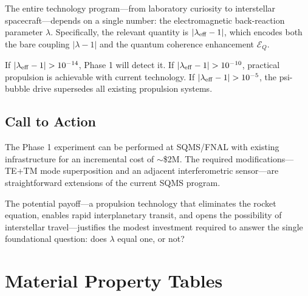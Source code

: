 \documentclass[twocolumn,prl,superscriptaddress,nofootinbib,longbibliography,floatfix]{revtex4-2}
\begin{document}
The entire technology program---from laboratory curiosity to
interstellar spacecraft---depends on a single number: the
electromagnetic back-reaction parameter $\lambda$.  Specifically, the
relevant quantity is $|\lambda_{\rm eff} - 1|$, which encodes both the
bare coupling $|\lambda - 1|$ and the quantum coherence enhancement
$\mathcal{E}_Q$.

If $|\lambda_{\rm eff} - 1| > 10^{-14}$, Phase 1 will detect it.
If $|\lambda_{\rm eff} - 1| > 10^{-10}$, practical propulsion is
achievable with current technology.
If $|\lambda_{\rm eff} - 1| > 10^{-5}$, the psi-bubble drive
supersedes all existing propulsion systems.

\subsection{Call to Action}

The Phase 1 experiment can be performed at SQMS/FNAL with existing
infrastructure for an incremental cost of $\sim$\$2M.  The required
modifications---TE+TM mode superposition and an adjacent
interferometric sensor---are straightforward extensions of the current
SQMS program.

The potential payoff---a propulsion technology that eliminates the
rocket equation, enables rapid interplanetary transit, and opens the
possibility of interstellar travel---justifies the modest investment
required to answer the single foundational question: does $\lambda$
equal one, or not?

\appendix

\section{Material Property Tables}\label{app:materials}
\end{document}
